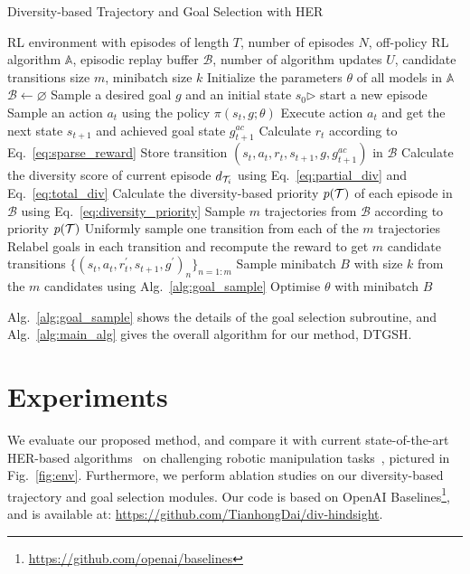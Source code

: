 \begin{algorithm}[t!]
\caption{Diversity-based Trajectory and Goal Selection with HER}
\label{alg:main_alg}
\begin{algorithmic}[1]
 \REQUIRE RL environment with episodes of length $T$, number of episodes $N$, off-policy RL algorithm $\mathbb{A}$, episodic replay buffer $\mathcal{B}$, number of algorithm updates $U$, candidate transitions size $m$, minibatch size $k$
 \STATE Initialize the parameters $\theta$ of all models in $\mathbb{A}$
 \STATE $\mathcal{B}\leftarrow\varnothing$
 \STATE Sample a desired goal $g$ and an initial state $s_{0}$\hfill{$\triangleright$ start a new episode}
 \STATE Sample an action $a_{t}$ using the policy $\pi(s_{t}, g;\theta)$
 \STATE Execute action $a_{t}$ and get the next state $s_{t+1}$ and achieved goal state $g^{ac}_{t+1}$
 \STATE Calculate $r_{t}$ according to Eq.~\eqref{eq:sparse_reward}
 \STATE Store transition $(s_t, a_t, r_t, s_{t+1}, g, g^{ac}_{t+1})$ in $\mathcal{B}$
 \ENDFOR
 \STATE Calculate the diversity score of current episode $d_{\mathcal{T}_{i}}$ using Eq.~\eqref{eq:partial_div} and Eq.~\eqref{eq:total_div}
 \STATE Calculate the diversity-based priority $p(\mathcal{T})$ of each episode in $\mathcal{B}$ using Eq.~\eqref{eq:diversity_priority}
 \STATE Sample $m$ trajectories from $\mathcal{B}$ according to priority $p(\mathcal{T})$
 \STATE Uniformly sample one transition from each of the $m$ trajectories
 \STATE Relabel goals in each transition and recompute the reward to get $m$ candidate transitions $\{(s_{t}, a_{t}, r_{t}^{\prime}, s_{t+1}, g^{\prime})_{n}\}_{n=1:m}$
 \STATE Sample minibatch $B$ with size $k$ from the $m$ candidates using Alg.~\ref{alg:goal_sample}
 \STATE Optimise $\theta$ with minibatch $B$
 \ENDFOR
 \ENDFOR 
\end{algorithmic}
\end{algorithm}

Alg.~\ref{alg:goal_sample} shows the details of the goal selection subroutine, and Alg.~\ref{alg:main_alg} gives the overall algorithm for our method, DTGSH.

\section{Experiments}
We evaluate our proposed method, and compare it with current state-of-the-art HER-based algorithms~\cite{NIPS2017_453fadbd,fang2019curriculum,zhao2018energy} on challenging robotic manipulation tasks~\cite{plappert2018multi}, pictured in Fig.~\ref{fig:env}. Furthermore, we perform ablation studies on our diversity-based trajectory and goal selection modules. Our code is based on OpenAI Baselines\footnote[1]{\url{https://github.com/openai/baselines}}, and is available at: \url{https://github.com/TianhongDai/div-hindsight}.


